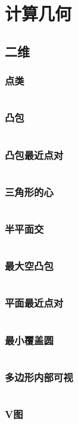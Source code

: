 \section{计算几何}

\subsection{二维}
\subsubsection{点类}
\inputminted{cpp}{\source/geometry/2d/basis.cpp}
\subsubsection{凸包}
\inputminted{cpp}{\source/geometry/2d/convex.cpp}
\subsubsection{凸包最近点对}
\inputminted{cpp}{\source/geometry/2d/convex-full.cpp}
\subsubsection{三角形的心}
\inputminted{cpp}{\source/geometry/2d/triangle.cpp}
\subsubsection{半平面交}
\inputminted{cpp}{\source/geometry/2d/half-plane-intersection.cpp}
\subsubsection{最大空凸包}
\inputminted{cpp}{\source/geometry/2d/max-convex.cpp}
\subsubsection{平面最近点对}
\inputminted{cpp}{\source/geometry/2d/closest.cpp}
\subsubsection{最小覆盖圆}
\inputminted{cpp}{\source/geometry/2d/mincircle.cpp}
\subsubsection{多边形内部可视}
\inputminted{cpp}{\source/geometry/2d/sight.cpp}
\subsubsection{V图}
\inputminted{cpp}{\source/geometry/2d/V-graph.cpp}

